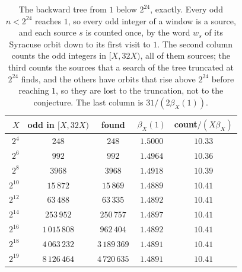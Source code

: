 \begin{table}[t]
\centering\footnotesize
\setlength{\tabcolsep}{4pt}
\caption{The backward tree from $1$ below $2^{24}$, exactly. Every odd $n<2^{24}$ reaches $1$, so every odd integer of a window is a source, and each source $s$ is counted once, by the word $w_s$ of its Syracuse orbit down to its first visit to $1$. The second column counts the odd integers in $[X,32X)$, all of them sources; the third counts the sources that a search of the tree truncated at $2^{24}$ finds, and the others have orbits that rise above $2^{24}$ before reaching $1$, so they are lost to the truncation, not to the conjecture. The last column is $31/(2\beta_X(1))$.}
\label{tab:ch9b:tree}
\begin{tabular}{@{}rcccc@{}}
\toprule
$X$ & odd in $[X,32X)$ & found & $\beta_X(1)$ & count$/(X\beta_X)$ \\
\midrule
$2^{4}$ & $248$ & $248$ & $1.5000$ & $10.33$ \\
$2^{6}$ & $992$ & $992$ & $1.4964$ & $10.36$ \\
$2^{8}$ & $3968$ & $3968$ & $1.4918$ & $10.39$ \\
$2^{10}$ & $15\,872$ & $15\,869$ & $1.4889$ & $10.41$ \\
$2^{12}$ & $63\,488$ & $63\,335$ & $1.4892$ & $10.41$ \\
$2^{14}$ & $253\,952$ & $250\,757$ & $1.4897$ & $10.41$ \\
$2^{16}$ & $1\,015\,808$ & $962\,404$ & $1.4892$ & $10.41$ \\
$2^{18}$ & $4\,063\,232$ & $3\,189\,369$ & $1.4891$ & $10.41$ \\
$2^{19}$ & $8\,126\,464$ & $4\,720\,635$ & $1.4891$ & $10.41$ \\
\bottomrule
\end{tabular}
\end{table}


